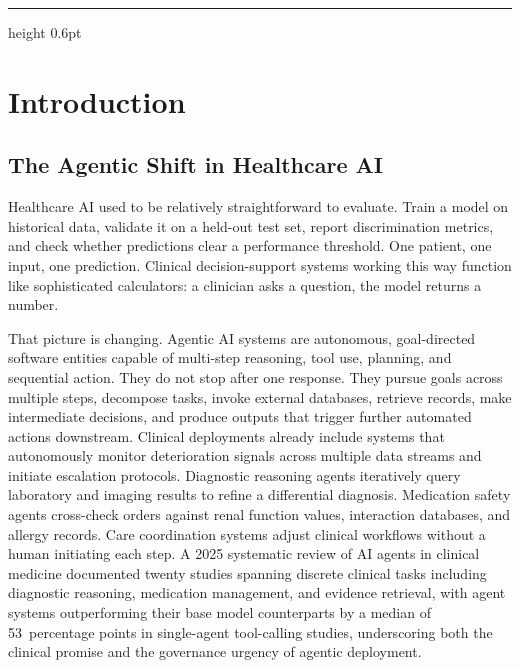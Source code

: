 \documentclass[12pt,a4paper]{article}
\begin{document}
\vspace{8pt}
\hrule height 0.6pt
\vspace{10pt}

\section*{Introduction}

\subsection*{The Agentic Shift in Healthcare AI}

Healthcare AI used to be relatively straightforward to evaluate.
Train a model on historical data, validate it on a held-out test
set, report discrimination metrics, and check whether predictions
clear a performance threshold. One patient, one input, one
prediction. Clinical decision-support systems working this way
function like sophisticated calculators: a clinician asks a
question, the model returns a number.

That picture is changing. Agentic AI systems are autonomous,
goal-directed software entities capable of multi-step reasoning,
tool use, planning, and sequential action. They do not stop after
one response. They pursue goals across multiple steps, decompose
tasks, invoke external databases, retrieve records, make
intermediate decisions, and produce outputs that trigger further
automated actions downstream. Clinical deployments already include systems that autonomously
monitor deterioration signals across multiple data streams and
initiate escalation protocols. Diagnostic reasoning agents
iteratively query laboratory and imaging results to refine a
differential diagnosis. Medication safety agents cross-check
orders against renal function values, interaction databases, and
allergy records. Care coordination systems adjust clinical
workflows without a human initiating each
step.\cite{rajpurkar2022} A 2025 systematic review of AI agents
in clinical medicine documented twenty studies spanning discrete
clinical tasks including diagnostic reasoning, medication
management, and evidence retrieval, with agent systems
outperforming their base model counterparts by a median of
53~percentage points in single-agent tool-calling studies,
underscoring both the clinical promise and the governance urgency
of agentic deployment.\cite{gorenshtein2025}
\end{document}
